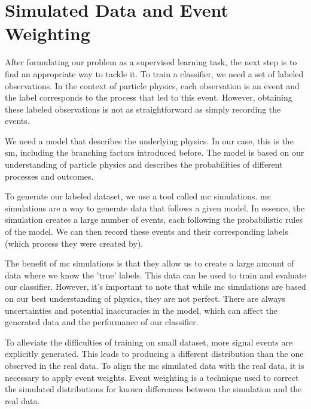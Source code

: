 
\section{Simulated Data and Event Weighting}

After formulating our problem as a supervised learning task, the next step is to find an appropriate way to tackle it.
To train a classifier, we need a set of labeled observations. In the context of particle physics, each observation is an
event and the label corresponds to the process that led to this event. However, obtaining these labeled observations is
not as straightforward as simply recording the events.

We need a model that describes the underlying physics. In our case, this is the \gls{sm}, including the branching
factors introduced before. The model is based on our understanding of particle physics and describes the probabilities
of different processes and outcomes.

To generate our labeled dataset, we use a tool called \gls{mc} simulations. \gls{mc} simulations are a way to generate
data that follows a given model. In essence, the simulation creates a large number of events, each following the
probabilistic rules of the model. We can then record these events and their corresponding labels (which process they
were created by).

The benefit of \gls{mc} simulations is that they allow us to create a large amount of data where we know the 'true' labels.
This data can be used to train and evaluate our classifier. However, it's important to note that while \gls{mc} simulations
are based on our best understanding of physics, they are not perfect. There are always uncertainties and potential
inaccuracies in the model, which can affect the generated data and the performance of our classifier.

To alleviate the difficulties of training on small dataset, more signal events are explicitly generated. This leads to
producing a different distribution than the one observed in the real data. To align the \gls{mc} simulated data with the real
data, it is necessary to apply event weights. Event weighting is a technique used to correct the simulated distributions
for known differences between the simulation and the real data.



